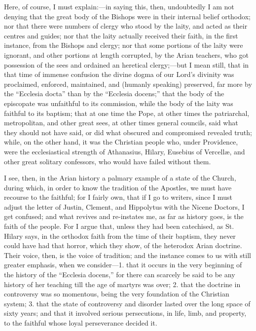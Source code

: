 Here, of course, I must explain:—in saying this,
then, undoubtedly I am not denying that the great body of the Bishops
were in their internal belief orthodox; nor that there were numbers of
clergy who stood by the laity, and acted as their centres and guides;
nor that the laity actually received their faith, in the first instance,
from the Bishops and clergy; nor that some portions of the laity were
ignorant, and other portions at length corrupted, by the Arian teachers,
who got possession of the sees and ordained an heretical clergy;—but I
mean still, that in that time of immense confusion the divine dogma of
our Lord's divinity was proclaimed, enforced, maintained, and (humanly
speaking) preserved, far more by the ``Ecclesia docta'' than by the ``Ecclesia
docens;'' that the body of the episcopate was unfaithful to its
commission, while the body of the laity was faithful to its baptism;
that at one time the Pope, at other times the patriarchal, metropolitan,
and other great sees, at other times general councils, said what they
should not have said, or did what obscured and compromised revealed
truth; while, on the other hand, it was the Christian people who, under
Providence, were the ecclesiastical strength of Athanasius, Hilary,
Eusebius of Vercellæ, and other great solitary confessors, who would
have failed without them.

I see, then, in the Arian history a palmary example
of a state of the Church, during which, in order to know the tradition
of the Apostles, we must have recourse to the faithful; for I fairly
own, that if I go to writers, since I must adjust the letter of Justin,
Clement, and Hippolytus with the Nicene Doctors, I get confused; and
what revives and re-instates me, as far as history goes, is the faith of
the people. For I argue that, unless they had been catechised, as St.
Hilary says, in the orthodox faith from the time of their baptism, they
never could have had that horror, which they show, of the heterodox
Arian doctrine. Their voice, then, is the voice of tradition; and
the instance comes to us with still greater emphasis, when we
consider—1. that it occurs in the very beginning of the history of the
``Ecclesia docens,'' for there can scarcely be said to be any history of
her teaching till the age of martyrs was over; 2. that the doctrine in
controversy was so momentous, being the very foundation of the Christian
system; 3. that the state of controversy and disorder lasted over the
long space of sixty years; and that
it involved serious persecutions, in life, limb, and property, to the
faithful whose loyal perseverance decided it.

